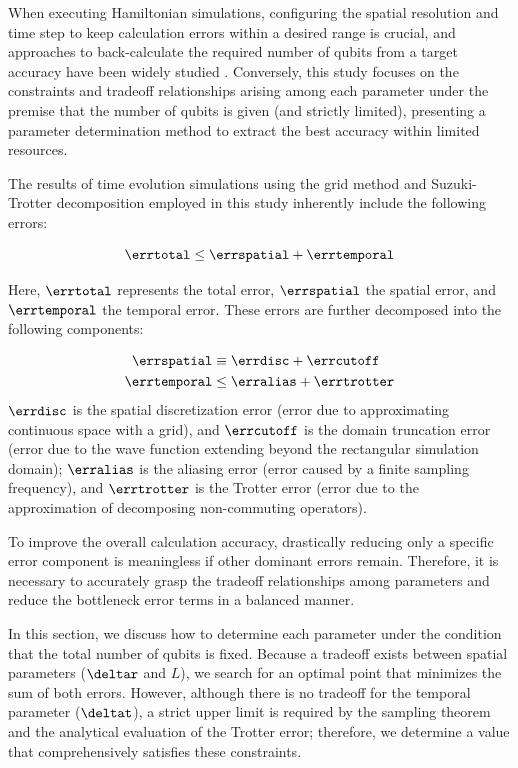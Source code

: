 \documentclass[manuscript_main.tex]{subfiles}
\begin{document}
When executing Hamiltonian simulations, configuring the spatial resolution and
time step to keep calculation errors within a desired range is crucial, and
approaches to back-calculate the required number of qubits from a target
accuracy have been widely studied \cite{FEIT1982412, Kivlichan_2017,
Chan2023.sciadv.abo7484}. Conversely, this study focuses on the constraints and
tradeoff relationships arising among each parameter under the premise that
the number of qubits is given (and strictly limited), presenting a parameter
determination method to extract the best accuracy within limited resources.

The results of time evolution simulations using the grid method and
Suzuki-Trotter decomposition employed in this study inherently include the
following errors:

\begin{equation}
\errtotal \leq \errspatial + \errtemporal
\label{eq:error-total-decomposition}
\end{equation}

Here, $\errtotal$ represents the total error, $\errspatial$ the spatial error,
and $\errtemporal$ the temporal error. These errors are further decomposed into
the following components:

\begin{align}
    \errspatial &\equiv \errdisc + \errcutoff \\
    \errtemporal &\leq \erralias + \errtrotter
\end{align}
$\errdisc$ is the spatial discretization error (error due to approximating
continuous space with a grid), and $\errcutoff$ is the domain truncation error
(error due to the wave function extending beyond the rectangular simulation
domain); $\erralias$ is the aliasing error (error caused by a
finite sampling frequency), and $\errtrotter$ is the Trotter error (error due to
the approximation of decomposing non-commuting operators).

To improve the overall calculation accuracy, drastically reducing only a
specific error component is meaningless if other dominant errors remain.
Therefore, it is necessary to accurately grasp the tradeoff relationships among
parameters and reduce the bottleneck error terms in a balanced manner.

In this section, we discuss how to determine each parameter under the condition
that the total number of qubits is fixed. Because a tradeoff exists between
spatial parameters ($\deltar$ and $L$), we search for an optimal point that
minimizes the sum of both errors. However, although there is no tradeoff for the
temporal parameter ($\deltat$), a strict upper limit is required by the sampling
theorem and the analytical evaluation of the Trotter error; therefore, we
determine a value that comprehensively satisfies these constraints.
\end{document}
